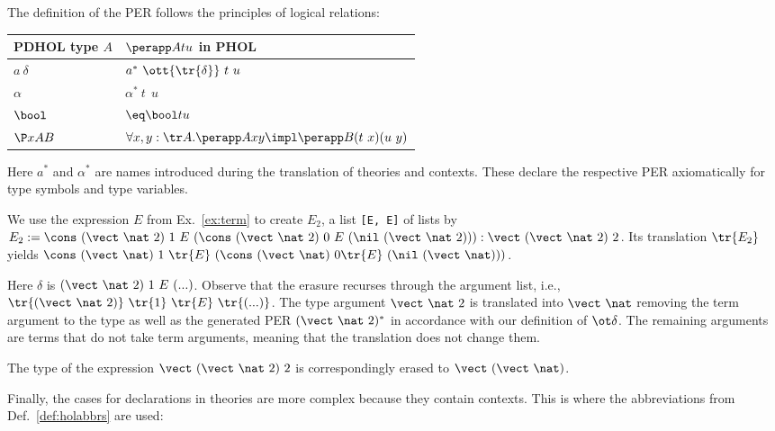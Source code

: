 The definition of the PER follows the principles of logical relations:
\begin{center}
\begin{tabular}{|l|l|}
\hline
PDHOL type $A$ & $\perapp Atu$ in PHOL\\
\hline
$a\ \delta$ & $a^*\ \ott{\tr{\delta}}\ t\ u$ \\
$\alpha$ & $\alpha^*\ t\ \ u$ \\
$\bool$ &  $\eq\bool tu$ \\
$\P xAB$ & $\forall x,y:\tr A. \perapp Axy\impl \perapp B{(t\ x)}{(u\ y)}$ \\
\hline
\end{tabular}
\end{center}
Here $a^*$ and $\alpha^*$ are names introduced during the translation of theories and contexts.
These declare the respective PER axiomatically for type symbols and type variables.

\begin{example}
  \label{ex:trans1}
  We use the expression \(E\) from Ex.~\ref{ex:term} to create \(E_2\), a list \texttt{[E, E]} of lists by \(E_2 := \cons\ (\vect\ \nat\ 2)\ 1\
  E\ (\cons\ (\vect\ \nat\ 2)\ 0\ E\ (\nil\ (\vect\ \nat\ 2))):\vect\ (\vect\ \nat\ 2)\ 2\).
  Its translation \(\tr{E_2}\) yields \(\cons\ (\vect\
  \nat)\ 1\ \tr{E}\ (\cons\ (\vect\ \nat)\ 0\newline \tr{E}\ (\nil\ (\vect\ \nat)))\).
  
  Here \(\delta\) is \((\vect\ \nat\ 2)\ 1\ E\ (...)\). Observe that
  the erasure recurses through the argument list, i.e., \(\tr{(\vect\ \nat\ 2)}\ \tr{1}\ \tr{E}\ 
  \tr{(...)}\). The type argument \(\vect\ \nat\ 2\) is translated into \(\vect\ \nat\)
  removing the term argument to the type as well as the generated PER \((\vect\ \nat\ 2)^*\) in
  accordance with our definition of \(\ot\delta\). The remaining arguments are terms that do not
  take term arguments, meaning that the translation does not change them.

  The type of the expression \(\vect\ (\vect\ \nat\ 2)\ 2\) is correspondingly erased to
  \(\vect\ (\vect\ \nat)\).
\end{example}

Finally, the cases for declarations in theories are more complex because they contain contexts.
This is where the abbreviations from Def.~\ref{def:holabbrs} are used:

